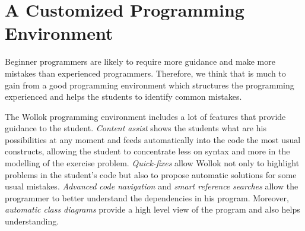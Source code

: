 
\section{A Customized Programming Environment}
\label{sec:environment}

Beginner programmers are likely to require more guidance and make more mistakes than experienced programmers.
Therefore, we think that is much to gain from a good programming environment which structures the programming experienced and helps the students to identify common mistakes.

% 
The Wollok programming environment includes a lot of features that provide guidance to the student.
\emph{Content assist} shows the students what are his possibilities at any moment and feeds automatically into the code the most usual constructs, 
allowing the student to concentrate less on syntax and more in the modelling of the exercise problem.
\emph{Quick-fixes} allow Wollok not only to highlight problems in the student's code but also to propose automatic solutions for some usual mistakes.
\emph{Advanced code navigation} and \emph{smart reference searches} allow the programmer to better understand the dependencies in his program.
Moreover, \emph{automatic class diagrams} provide a high level view of the program and also helps understanding.

